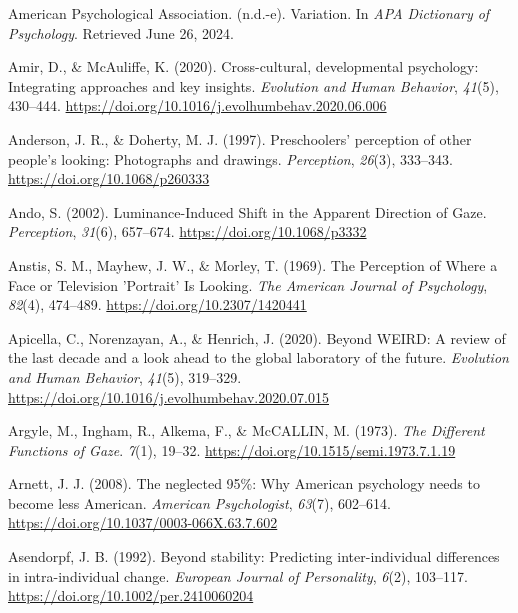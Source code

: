 \documentclass[
]{scrbook}
\newlength{\cslhangindent}
\newenvironment{CSLReferences}[2] %
 {\begin{list}{}{%
  \setlength{\itemindent}{0pt}
  \setlength{\leftmargin}{0pt}
  \setlength{\parsep}{0pt}
  \ifodd #1
   \setlength{\leftmargin}{\cslhangindent}
   \setlength{\itemindent}{-1\cslhangindent}
  \fi
  \setlength{\itemsep}{#2\baselineskip}}}
 {\end{list}}
\begin{document}
\begin{CSLReferences}{1}{0}
American Psychological Association. (n.d.-e). Variation. In \emph{APA Dictionary of Psychology}. Retrieved June 26, 2024.

Amir, D., \& McAuliffe, K. (2020). Cross-cultural, developmental psychology: Integrating approaches and key insights. \emph{Evolution and Human Behavior}, \emph{41}(5), 430--444. \url{https://doi.org/10.1016/j.evolhumbehav.2020.06.006}

Anderson, J. R., \& Doherty, M. J. (1997). Preschoolers' perception of other people's looking: {Photographs} and drawings. \emph{Perception}, \emph{26}(3), 333--343. \url{https://doi.org/10.1068/p260333}

Ando, S. (2002). Luminance-{Induced Shift} in the {Apparent Direction} of {Gaze}. \emph{Perception}, \emph{31}(6), 657--674. \url{https://doi.org/10.1068/p3332}

Anstis, S. M., Mayhew, J. W., \& Morley, T. (1969). The {Perception} of {Where} a {Face} or {Television} '{Portrait}' {Is Looking}. \emph{The American Journal of Psychology}, \emph{82}(4), 474--489. \url{https://doi.org/10.2307/1420441}

Apicella, C., Norenzayan, A., \& Henrich, J. (2020). Beyond {WEIRD}: {A} review of the last decade and a look ahead to the global laboratory of the future. \emph{Evolution and Human Behavior}, \emph{41}(5), 319--329. \url{https://doi.org/10.1016/j.evolhumbehav.2020.07.015}

Argyle, M., Ingham, R., Alkema, F., \& McCALLIN, M. (1973). \emph{The {Different Functions} of {Gaze}}. \emph{7}(1), 19--32. \url{https://doi.org/10.1515/semi.1973.7.1.19}

Arnett, J. J. (2008). The neglected 95\%: {Why American} psychology needs to become less {American}. \emph{American Psychologist}, \emph{63}(7), 602--614. \url{https://doi.org/10.1037/0003-066X.63.7.602}

Asendorpf, J. B. (1992). Beyond stability: {Predicting} inter-individual differences in intra-individual change. \emph{European Journal of Personality}, \emph{6}(2), 103--117. \url{https://doi.org/10.1002/per.2410060204}


\end{CSLReferences}
\end{document}
